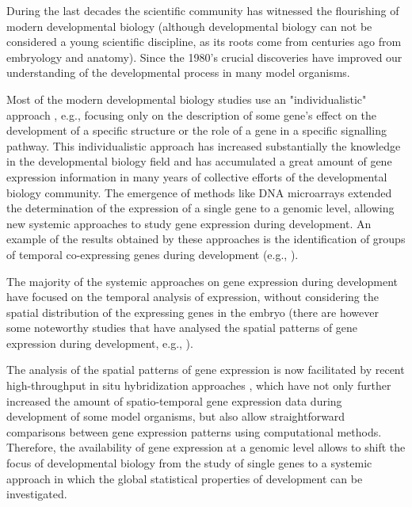 
During the last decades the scientific community has witnessed the flourishing of modern developmental biology (although developmental biology can not be considered a young scientific discipline, as its roots come from centuries ago from embryology and anatomy). Since the 1980's crucial discoveries \citep{Gilbert1998} have improved our understanding of the developmental process in many model organisms.

Most of the modern developmental biology studies use an "individualistic" approach \citep{Davidson2009}, e.g., focusing only on the description of some gene's effect on the development of a specific structure or the role of a gene in a specific signalling pathway.
%
This individualistic approach has increased substantially the knowledge in the developmental biology field and has accumulated a great amount of gene expression information in many years of collective efforts of the developmental biology community.
The emergence of methods like DNA microarrays extended the determination of the expression of a single gene to a genomic level, allowing new systemic approaches to study gene expression during development. An example of the results obtained by these approaches is the identification of groups of temporal co-expressing genes during development (e.g., \citealp{Arbeitman2002,Hooper2007}).

The majority of the systemic approaches on gene expression during development have focused on the temporal analysis of expression, without considering the spatial distribution of the expressing genes in the embryo (there are however some noteworthy studies that have analysed the spatial patterns of gene expression during development, e.g., \citealp{Gurunathan2004,Tomancak2007,Frise2010,Crombach2012,Konikoff2012}).

The analysis of the spatial patterns of gene expression is now facilitated by recent high-throughput in situ hybridization approaches \citep{Tomancak2002,Pollet2003,Imai2004,Christiansen2006,Lecuyer2007,Tassy2010}, which have not only further increased the amount of spatio-temporal gene expression data during development of some model organisms, but also allow straightforward comparisons between gene expression patterns using computational methods.
Therefore, the availability of gene expression at a genomic level allows to shift the focus of developmental biology from the study of single genes to a systemic approach in which the global statistical properties of development can be investigated.

